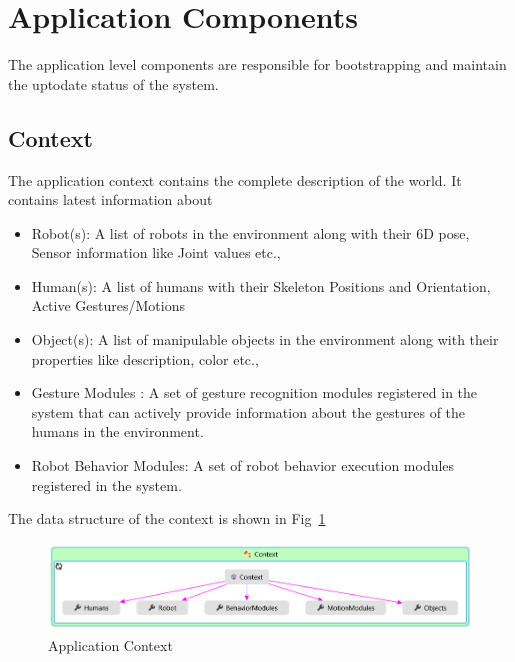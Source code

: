 \section{Application Components}
\label{ssec:app_comp}
The application level components are responsible for bootstrapping and maintain the uptodate status of the system. 
\subsection{Context}
The application context contains the complete description of the world. It contains latest information about
\begin{itemize}
\item Robot(s): A list of robots in the environment along with their 6D pose, Sensor information like Joint values etc.,
\item Human(s): A list of humans with their Skeleton Positions and Orientation, Active Gestures/Motions
\item Object(s): A list of manipulable objects in the environment along with their properties like description, color etc.,
\item Gesture Modules : A set of gesture recognition modules registered in the system that can actively provide information about the gestures of the humans in the environment.
\item Robot Behavior Modules: A set of robot behavior execution modules registered in the system.
\end{itemize}
The data structure of the context is shown in Fig~\ref{fig:system_context}
\begin{figure}
\centering
\includegraphics[width=\textwidth]{assets/context_diagram.png}
\caption[Application Context]{Application Context}
\label{fig:system_context}
\end{figure}
